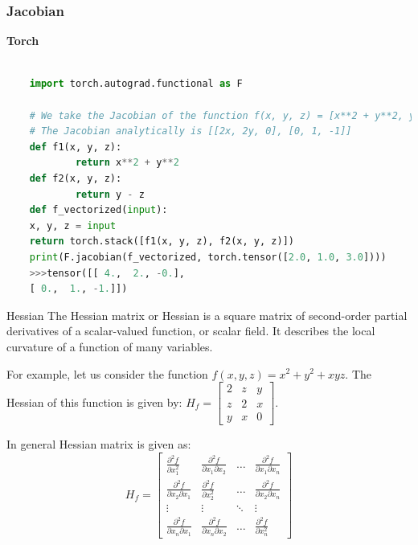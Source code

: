 \documentclass{beamer}
\begin{document}
\begin{frame}[fragile]
    \frametitle{Jacobian}

   
        \begin{tcolorbox}
            \textbf{Torch}
          
            \begin{lstlisting}[language=Python, linewidth=\textwidth, xleftmargin=-20pt]
    
    import torch.autograd.functional as F

    # We take the Jacobian of the function f(x, y, z) = [x**2 + y**2, y - z]
    # The Jacobian analytically is [[2x, 2y, 0], [0, 1, -1]]
    def f1(x, y, z):
            return x**2 + y**2
    def f2(x, y, z):
            return y - z
    def f_vectorized(input):
    x, y, z = input
    return torch.stack([f1(x, y, z), f2(x, y, z)])
    print(F.jacobian(f_vectorized, torch.tensor([2.0, 1.0, 3.0])))
    >>>tensor([[ 4.,  2., -0.],
    [ 0.,  1., -1.]])

    \end{lstlisting}
        \end{tcolorbox}
\end{frame}


\begin{frame}{Hessian}
    The Hessian matrix or Hessian is a square matrix of second-order partial derivatives of a scalar-valued function, or scalar field. It describes the local curvature of a function of many variables.

    For example, let us consider the function $f(x, y, z) = x^2 + y^2 + xyz$.
    The Hessian of this function is given by: $H_f = \begin{bmatrix} 2 & z & y\\ z & 2 & x \\ y & x & 0\end{bmatrix}$.

    In general Hessian matrix is given as:
    \begin{equation*}
        H_f = \begin{bmatrix} \frac{\partial^2 f}{\partial x_1^2} & \frac{\partial^2 f}{\partial x_1 \partial x_2} & \dots & \frac{\partial^2 f}{\partial x_1 \partial x_n} \\ \frac{\partial^2 f}{\partial x_2 \partial x_1} & \frac{\partial^2 f}{\partial x_2^2} & \dots & \frac{\partial^2 f}{\partial x_2 \partial x_n} \\ \vdots & \vdots & \ddots & \vdots \\ \frac{\partial^2 f}{\partial x_n \partial x_1} & \frac{\partial^2 f}{\partial x_n \partial x_2} & \dots & \frac{\partial^2 f}{\partial x_n^2} \end{bmatrix}
    \end{equation*}


\end{frame}
\end{document}

